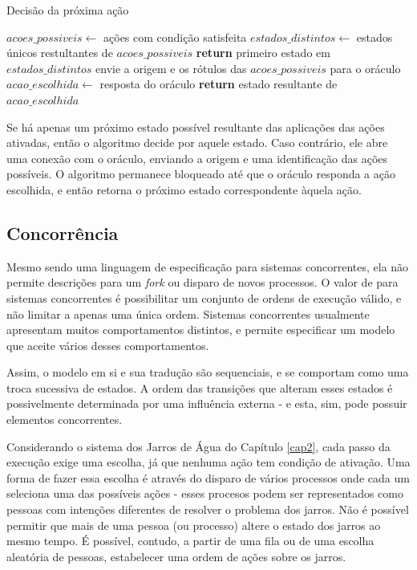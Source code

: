 \begin{algorithm}
\caption{Decisão da próxima ação}\label{alg:decide-action}
\begin{algorithmic}[1]
\State $acoes\_possiveis\gets$ ações com condição satisfeita
\State $estados\_distintos\gets$ estados únicos restultantes de $acoes\_possiveis$
\State \textbf{return} primeiro estado em $estados\_distintos$
\Else{}
\State envie a origem e os rótulos das $acoes\_possiveis$ para o oráculo
\State $acao\_escolhida\gets$ resposta do oráculo
\State \textbf{return} estado resultante de $acao\_escolhida$
\EndIf
\EndProcedure
\end{algorithmic}
\end{algorithm}

Se há apenas um próximo estado possível resultante das aplicações das ações
ativadas, então o algoritmo decide por aquele estado. Caso contrário, ele abre
uma conexão com o oráculo, enviando a origem e uma identificação das ações
possíveis. O algoritmo permanece bloqueado até que o oráculo responda a ação
escolhida, e então retorna o próximo estado correspondente àquela ação.


\subsection{Concorrência}

Mesmo \TLA sendo uma linguagem de especificação para sistemas concorrentes, ela
não permite descrições para um \textit{fork} ou disparo de novos
processos. O valor de \TLA para sistemas concorrentes é possibilitar um conjunto
de ordens de execução válido, e não limitar a apenas uma única ordem. Sistemas
concorrentes usualmente apresentam muitos comportamentos distintos, e \TLA
permite especificar um modelo que aceite vários desses comportamentos.

Assim, o modelo em si e sua tradução são sequenciais, e se comportam como uma troca
sucessiva de estados. A ordem das transições que alteram esses estados é
possivelmente determinada por uma influência externa - e esta, sim, pode possuir
elementos concorrentes.

Considerando o sistema dos Jarros de Água do Capítulo \ref{cap2}, cada passo da
execução exige uma escolha, já que nenhuma ação tem condição de ativação. Uma
forma de fazer essa escolha é através do disparo de vários processos onde cada
um seleciona uma das possíveis ações - esses procesos podem ser representados
como pessoas com intenções diferentes de resolver o problema dos jarros. Não é
possível permitir que mais de uma pessoa (ou processo) altere o estado dos
jarros ao mesmo tempo. É possível, contudo, a partir de uma fila ou de uma
escolha aleatória de pessoas, estabelecer uma ordem de ações sobre os jarros.

